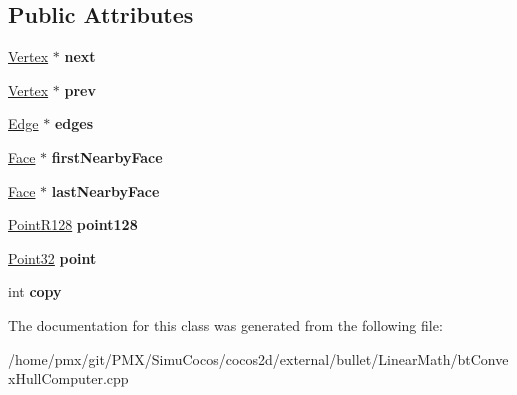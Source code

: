 \subsection*{Public Attributes}
\begin{DoxyCompactItemize}
\item 
\mbox{\label{classbtConvexHullInternal_1_1Vertex_a3f64cdb114285bb9d6be175640433d1f}} 
\hyperlink{classbtConvexHullInternal_1_1Vertex}{Vertex} $\ast$ {\bfseries next}
\item 
\mbox{\label{classbtConvexHullInternal_1_1Vertex_ac32658704326ef070e0df3d9f378f565}} 
\hyperlink{classbtConvexHullInternal_1_1Vertex}{Vertex} $\ast$ {\bfseries prev}
\item 
\mbox{\label{classbtConvexHullInternal_1_1Vertex_a2106108aa65a7e511a171e1c5d2ba0bb}} 
\hyperlink{classbtConvexHullInternal_1_1Edge}{Edge} $\ast$ {\bfseries edges}
\item 
\mbox{\label{classbtConvexHullInternal_1_1Vertex_a06c81d848b7e5f6c704cb4f9e806ed0f}} 
\hyperlink{classbtConvexHullInternal_1_1Face}{Face} $\ast$ {\bfseries first\+Nearby\+Face}
\item 
\mbox{\label{classbtConvexHullInternal_1_1Vertex_a67de245eefb3a7ba7e0d5dda378b50cd}} 
\hyperlink{classbtConvexHullInternal_1_1Face}{Face} $\ast$ {\bfseries last\+Nearby\+Face}
\item 
\mbox{\label{classbtConvexHullInternal_1_1Vertex_ae949e82a65f9ccb4dc9da1c2c0537d3c}} 
\hyperlink{classbtConvexHullInternal_1_1PointR128}{Point\+R128} {\bfseries point128}
\item 
\mbox{\label{classbtConvexHullInternal_1_1Vertex_a0c77d52a6bed1f70d7e1a8ec1e314072}} 
\hyperlink{classbtConvexHullInternal_1_1Point32}{Point32} {\bfseries point}
\item 
\mbox{\label{classbtConvexHullInternal_1_1Vertex_aec0c6585ff967f4603e332568ec5d7f5}} 
int {\bfseries copy}
\end{DoxyCompactItemize}


The documentation for this class was generated from the following file\+:\begin{DoxyCompactItemize}
\item 
/home/pmx/git/\+P\+M\+X/\+Simu\+Cocos/cocos2d/external/bullet/\+Linear\+Math/bt\+Convex\+Hull\+Computer.\+cpp\end{DoxyCompactItemize}
